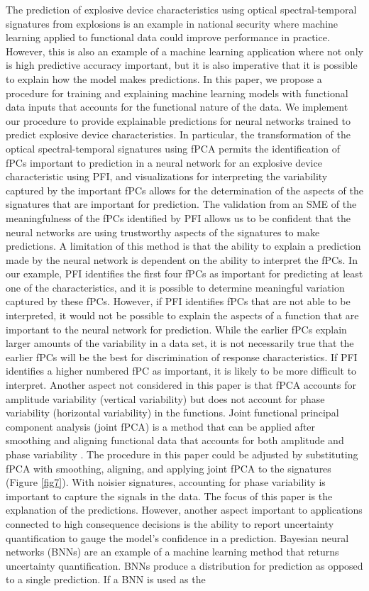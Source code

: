 \documentclass[letterpaper]{article}
\begin{document}
The prediction of explosive device characteristics using optical spectral-temporal signatures from explosions is an example in national security where machine learning applied to functional data could improve performance in practice. However, this is also an example of a machine learning application where not only is high predictive accuracy important, but it is also imperative that it is possible to explain how the model makes predictions. In this paper, we propose a procedure for training and explaining machine learning models with functional data inputs that accounts for the functional nature of the data. We implement our procedure to provide explainable predictions for neural networks trained to predict explosive device characteristics. In particular, the transformation of the optical spectral-temporal signatures using fPCA permits the identification of fPCs important to prediction in a neural network for an explosive device characteristic using PFI, and visualizations for interpreting the variability captured by the important fPCs allows for the determination of the aspects of the signatures that are important for prediction. The validation from an SME of the meaningfulness of the fPCs identified by PFI allows us to be confident that the neural networks are using trustworthy aspects of the signatures to make predictions.  A limitation of this method is that the ability to explain a prediction made by the neural network is dependent on the ability to interpret the fPCs. In our example, PFI identifies the first four fPCs as important for predicting at least one of the characteristics, and it is possible to determine meaningful variation captured by these fPCs. However, if PFI identifies fPCs that are not able to be interpreted, it would not be possible to explain the aspects of a function that are important to the neural network for prediction. While the earlier fPCs explain larger amounts of the variability in a data set, it is not necessarily true that the earlier fPCs will be the best for discrimination of response characteristics. If PFI identifies a higher numbered fPC as important, it is likely to be more difficult to interpret.  Another aspect not considered in this paper is that fPCA accounts for amplitude variability (vertical variability) but does not account for phase variability (horizontal variability) in the functions. Joint functional principal component analysis (joint fPCA) is a method that can be applied after smoothing and aligning functional data that accounts for both amplitude and phase variability \cite{lee:2017,tucker:2013}. The procedure in this paper could be adjusted by substituting fPCA with smoothing, aligning, and applying joint fPCA to the signatures (Figure \ref{fig7}). With noisier signatures, accounting for phase variability is important to capture the signals in the data.  The focus of this paper is the explanation of the predictions. However, another aspect important to applications connected to high consequence decisions is the ability to report uncertainty quantification to gauge the model's confidence in a prediction. Bayesian neural networks (BNNs) are an example of a machine learning method that returns uncertainty quantification. BNNs produce a distribution for prediction as opposed to a single prediction. If a BNN is used as the 
\end{document}
